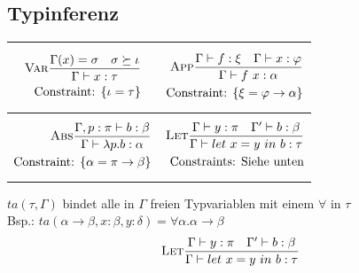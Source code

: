 \documentclass{Zusammenfassung}
\newcommand{\typeRule}[3]{ \textrm{\textsc{#1}}\frac{#2}{#3}}
\newcommand{\mylet}[3]{let\ #1=#2\ in\ #3}
\begin{document}
\subsection{Typinferenz}\label{subsec:typinferenz}
    \begin{table}[H]
        \centering
        \begin{tabularx}{\textwidth}{X|X}
            \begin{equation*}\begin{aligned}\typeRule{Var}{\Gamma(x)=\sigma\quad\sigma\succeq\iota}{\Gamma\vdash{}x:\tau} \\ \text{Constraint: }\{\iota=\tau\}\end{aligned}\end{equation*}&\begin{equation*}\begin{aligned}\typeRule{App}{\Gamma\vdash{}f:\xi\quad\Gamma\vdash{}x:\varphi}{\Gamma\vdash{}f\ x:\alpha}\\ \text{Constraint: }\{\xi=\varphi\rightarrow\alpha\}\end{aligned}\end{equation*}\\
            \hline
            \begin{equation*}\begin{aligned}\typeRule{Abs}{\Gamma,p:\pi\vdash{}b:\beta}{\Gamma\vdash\lambda{}p.b:\alpha}\\ \text{Constraint: }\{\alpha=\pi\rightarrow\beta\}\end{aligned}\end{equation*}&\begin{equation*}\begin{aligned}\typeRule{Let}{\Gamma\vdash{}y:\pi\quad\Gamma'\vdash{}b:\beta}{\Gamma\vdash\mylet{x}{y}{b:\tau}}\\ \text{Constraints: Siehe unten}\end{aligned}\end{equation*}\\
        \end{tabularx}\label{tab:table7}
    \end{table}
    $ta(\tau,\Gamma)$ bindet alle in $\Gamma$ freien Typvariablen mit einem $\forall$ in $\tau$\\
    Bsp.: $ta(\alpha\rightarrow\beta,x:\beta,y:\delta)=\forall\alpha.\alpha\rightarrow\beta$
    \begin{equation*}
        \typeRule{Let}{\Gamma\vdash{}y:\pi\quad\Gamma'\vdash{}b:\beta}{\Gamma\vdash\mylet{x}{y}{b:\tau}}
    \end{equation*}
\end{document}
